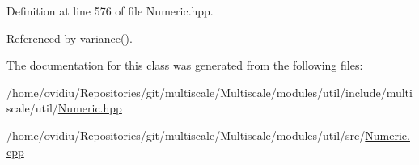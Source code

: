 Definition at line 576 of file Numeric.\-hpp.



Referenced by variance().



The documentation for this class was generated from the following files\-:\begin{DoxyCompactItemize}
\item 
/home/ovidiu/\-Repositories/git/multiscale/\-Multiscale/modules/util/include/multiscale/util/\hyperlink{Numeric_8hpp}{Numeric.\-hpp}\item 
/home/ovidiu/\-Repositories/git/multiscale/\-Multiscale/modules/util/src/\hyperlink{Numeric_8cpp}{Numeric.\-cpp}\end{DoxyCompactItemize}
